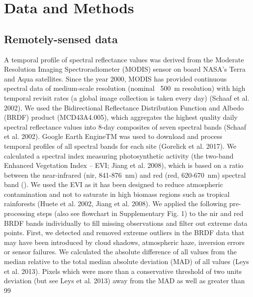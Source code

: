 \section{Data and Methods}
\subsection{Remotely-sensed data}
A temporal profile of spectral reflectance values was derived from the Moderate Resolution Imaging Spectroradiometer (MODIS) sensor on board NASA’s Terra and Aqua satellites. Since the year 2000, MODIS has provided continuous spectral data of medium-scale resolution (nominal ~500 m resolution) with high temporal revisit rates (a global image collection is taken every day) (Schaaf et al. 2002). We used the Bidirectional Reflectance Distribution Function and Albedo (BRDF) product (MCD43A4.005), which aggregates the highest quality daily spectral reflectance values into 8-day composites of seven spectral bands (Schaaf et al. 2002). Google Earth EngineTM was used to download and process temporal profiles of all spectral bands for each site (Gorelick et al. 2017). We calculated a spectral index measuring photosynthetic activity (the two-band Enhanced Vegetation Index – EVI; Jiang et al. 2008), which is based on a ratio between the near-infrared (nir, 841-876 nm) and red (red, 620-670 nm) spectral band (). We used the EVI as it has been designed to reduce atmospheric contamination and not to saturate in high biomass regions such as tropical rainforests (Huete et al. 2002, Jiang et al. 2008). We applied the following pre-processing steps (also see flowchart in Supplementary Fig. 1) to the nir and red BRDF bands individually to fill missing observations and filter out extreme data points. 
First, we detected and removed extreme outliers in the BRDF data that may have been introduced by cloud shadows, atmospheric haze, inversion errors or sensor failures. We calculated the absolute difference of all values from the median relative to the total median absolute deviation (MAD) of all values (Leys et al. 2013). Pixels which were more than a conservative threshold of two units deviation (but see Leys et al. 2013) away from the MAD as well as greater than 99 %
